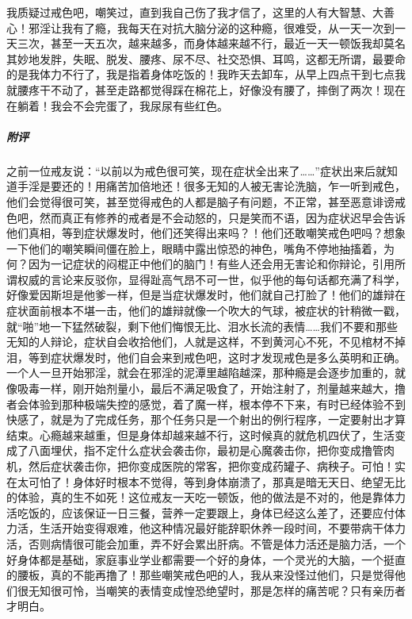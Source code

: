\begin{case}
    我质疑过戒色吧，嘲笑过，直到我自己伤了我才信了，这里的人有大智慧、大善心！邪淫让我有了瘾，我每天在对抗大脑分泌的这种瘾，很难受，从一天一次到一天三次，甚至一天五次，越来越多，而身体越来越不行，最近一天一顿饭我却莫名其妙地发胖，失眠、脱发、腰疼、尿不尽、社交恐惧、耳鸣，这都无所谓，最要命的是我体力不行了，我是指着身体吃饭的！我昨天去卸车，从早上四点干到七点我就腰疼干不动了，甚至走路都觉得踩在棉花上，好像没有腰了，摔倒了两次！现在在躺着！我会不会完蛋了，我尿尿有些红色。
    \subparagraph{附评} 之前一位戒友说：“以前以为戒色很可笑，现在症状全出来了……”症状出来后就知道手淫是要还的！用痛苦加倍地还！很多无知的人被无害论洗脑，乍一听到戒色，他们会觉得很可笑，甚至觉得戒色的人都是脑子有问题，不正常，甚至恶意诽谤戒色吧，然而真正有修养的戒者是不会动怒的，只是笑而不语，因为症状迟早会告诉他们真相，等到症状爆发时，他们还笑得出来吗？！他们还敢嘲笑戒色吧吗？想象一下他们的嘲笑瞬间僵在脸上，眼睛中露出惊恐的神色，嘴角不停地抽搐着，为何？因为一记症状的闷棍正中他们的脑门！有些人还会用无害论和你辩论，引用所谓权威的言论来反驳你，显得趾高气昂不可一世，似乎他的每句话都充满了科学，好像爱因斯坦是他爹一样，但是当症状爆发时，他们就自己打脸了！他们的雄辩在症状面前根本不堪一击，他们的雄辩就像一个吹大的气球，被症状的针稍微一戳，就“啪”地一下猛然破裂，剩下他们悔恨无比、泪水长流的表情……我们不要和那些无知的人辩论，症状自会收拾他们，人就是这样，不到黄河心不死，不见棺材不掉泪，等到症状爆发时，他们自会来到戒色吧，这时才发现戒色是多么英明和正确。一个人一旦开始邪淫，就会在邪淫的泥潭里越陷越深，那种瘾是会逐步加重的，就像吸毒一样，刚开始剂量小，最后不满足吸食了，开始注射了，剂量越来越大，撸者会体验到那种极端失控的感觉，着了魔一样，根本停不下来，有时已经体验不到快感了，就是为了完成任务，那个任务只是一个射出的例行程序，一定要射出才算结束。心瘾越来越重，但是身体却越来越不行，这时候真的就危机四伏了，生活变成了八面埋伏，指不定什么症状会袭击你，最初是心魔袭击你，把你变成撸管肉机，然后症状袭击你，把你变成医院的常客，把你变成药罐子、病秧子。可怕！实在太可怕了！身体好时根本不觉得，等到身体崩溃了，那真是暗无天日、绝望无比的体验，真的生不如死！这位戒友一天吃一顿饭，他的做法是不对的，他是靠体力活吃饭的，应该保证一日三餐，营养一定要跟上，身体已经这么差了，还要应付体力活，生活开始变得艰难，他这种情况最好能辞职休养一段时间，不要带病干体力活，否则病情很可能会加重，弄不好会累出肝病。不管是体力活还是脑力活，一个好身体都是基础，家庭事业学业都需要一个好的身体，一个灵光的大脑，一个挺直的腰板，真的不能再撸了！那些嘲笑戒色吧的人，我从来没怪过他们，只是觉得他们很无知很可怜，当嘲笑的表情变成惶恐绝望时，那是怎样的痛苦呢？只有亲历者才明白。
\end{case}

